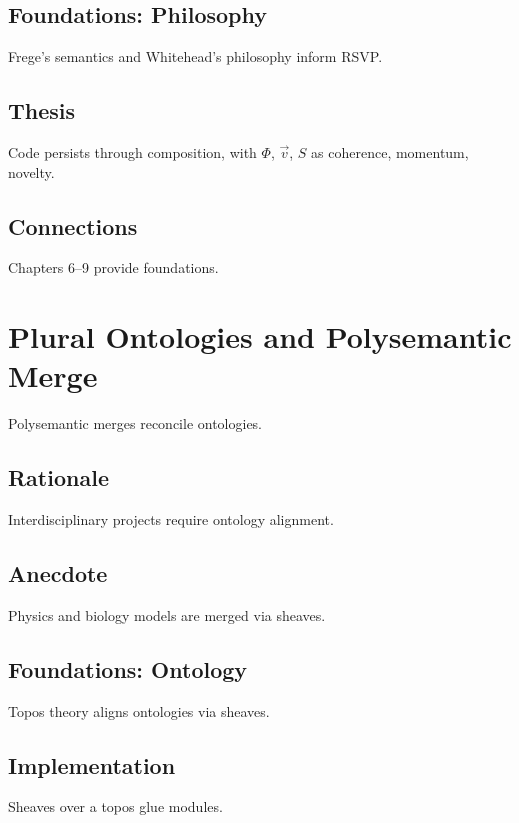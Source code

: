 \documentclass[12pt]{article}
\begin{document}
\subsection{Foundations: Philosophy}
Frege’s semantics and Whitehead’s philosophy inform RSVP.

\subsection{Thesis}
Code persists through composition, with $\Phi$, $\vec{v}$, $S$ as coherence, momentum, novelty.

\subsection{Connections}
Chapters 6–9 provide foundations.

\section{Plural Ontologies and Polysemantic Merge}
\label{sec:chapter14}

Polysemantic merges reconcile ontologies.

\subsection{Rationale}
Interdisciplinary projects require ontology alignment.

\subsection{Anecdote}
Physics and biology models are merged via sheaves.

\subsection{Foundations: Ontology}
Topos theory aligns ontologies via sheaves.

\subsection{Implementation}
Sheaves over a topos glue modules.

\begin{center}
\end{center}
\end{document}
